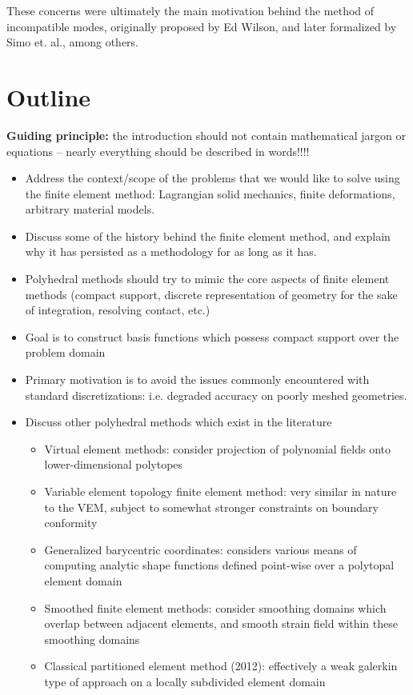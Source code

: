 These concerns were ultimately the main motivation behind the method of incompatible modes, originally proposed by Ed Wilson, and later formalized by Simo et. al., among others.

\section{Outline}

\textbf{Guiding principle:} the introduction should not contain mathematical jargon or equations -- nearly everything should be described in words!!!!

\begin{itemize}
	\item Address the context/scope of the problems that we would like to solve using the finite element method: Lagrangian solid mechanics, finite deformations, arbitrary material models.
	\item Discuss some of the history behind the finite element method, and explain why it has persisted as a methodology for as long as it has.
	\item Polyhedral methods should try to mimic the core aspects of finite element methods (compact support, discrete representation of geometry for the sake of integration, resolving contact, etc.)
	\item Goal is to construct basis functions which possess compact support over the problem domain
	\item Primary motivation is to avoid the issues commonly encountered with standard discretizations: i.e. degraded accuracy on poorly meshed geometries.
	\item Discuss other polyhedral methods which exist in the literature
	\begin{itemize}
		\item Virtual element methods: consider projection of polynomial fields onto lower-dimensional polytopes
		\item Variable element topology finite element method: very similar in nature to the VEM, subject to somewhat stronger constraints on boundary conformity
		\item Generalized barycentric coordinates: considers various means of computing analytic shape functions defined point-wise over a polytopal element domain
		\item Smoothed finite element methods: consider smoothing domains which overlap between adjacent elements, and smooth strain field within these smoothing domains
		\item Classical partitioned element method (2012): effectively a weak galerkin type of approach on a locally subdivided element domain

\end{itemize}
\end{itemize}
